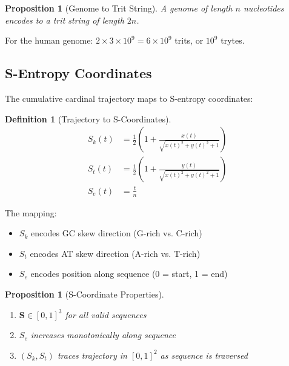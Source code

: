\documentclass[twocolumn,10pt]{article}
\newtheorem{definition}[theorem]{Definition}
\newtheorem{proposition}[theorem]{Proposition}
\theoremstyle{remark}
\newcommand{\Sk}{S_k}
\newcommand{\St}{S_t}
\newcommand{\Se}{S_e}
\newcommand{\Scoord}{\mathbf{S}}
\begin{document}
\begin{proposition}[Genome to Trit String]
A genome of length $n$ nucleotides encodes to a trit string of length $2n$.
\end{proposition}

For the human genome: $2 \times 3 \times 10^9 = 6 \times 10^9$ trits, or $10^9$ trytes.

\subsection{S-Entropy Coordinates}

The cumulative cardinal trajectory maps to S-entropy coordinates:

\begin{definition}[Trajectory to S-Coordinates]
\begin{align}
\Sk(t) &= \frac{1}{2}\left(1 + \frac{x(t)}{\sqrt{x(t)^2 + y(t)^2 + 1}}\right) \\
\St(t) &= \frac{1}{2}\left(1 + \frac{y(t)}{\sqrt{x(t)^2 + y(t)^2 + 1}}\right) \\
\Se(t) &= \frac{t}{n}
\end{align}
\end{definition}

The mapping:
\begin{itemize}
\item $\Sk$ encodes GC skew direction (G-rich vs. C-rich)
\item $\St$ encodes AT skew direction (A-rich vs. T-rich)
\item $\Se$ encodes position along sequence (0 = start, 1 = end)
\end{itemize}

\begin{proposition}[S-Coordinate Properties]
\begin{enumerate}
\item $\Scoord \in [0,1]^3$ for all valid sequences
\item $\Se$ increases monotonically along sequence
\item $(\Sk, \St)$ traces trajectory in $[0,1]^2$ as sequence is traversed
\end{enumerate}
\end{proposition}
\end{document}
